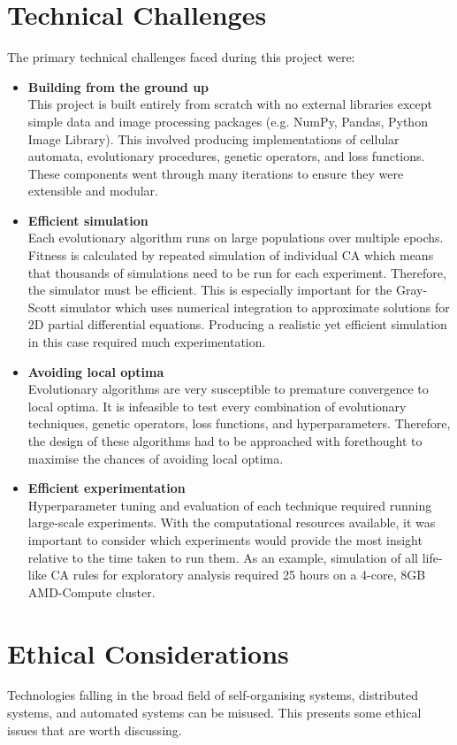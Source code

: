 \section{Technical Challenges}
The primary technical challenges faced during this project were:
\begin{itemize}
    \item \textbf{Building from the ground up}\\ This project is built entirely from scratch with no external libraries except simple data and image processing packages (e.g. NumPy, Pandas, Python Image Library). This involved producing implementations of cellular automata, evolutionary procedures, genetic operators, and loss functions. These components went through many iterations to ensure they were extensible and modular.
    \item \textbf{Efficient simulation}\\ Each evolutionary algorithm runs on large populations over multiple epochs. Fitness is calculated by repeated simulation of individual CA which means that thousands of simulations need to be run for each experiment. Therefore, the simulator must be efficient. This is especially important for the Gray-Scott simulator which uses numerical integration to approximate solutions for 2D partial differential equations. Producing a realistic yet efficient simulation in this case required much experimentation.
    \item \textbf{Avoiding local optima}\\ Evolutionary algorithms are very susceptible to premature convergence to local optima. It is infeasible to test every combination of evolutionary techniques, genetic operators, loss functions, and hyperparameters. Therefore, the design of these algorithms had to be approached with forethought to maximise the chances of avoiding local optima. 
    \item \textbf{Efficient experimentation}\\ Hyperparameter tuning and evaluation of each technique required running large-scale experiments. With the computational resources available, it was important to consider which experiments would provide the most insight relative to the time taken to run them. As an example, simulation of all life-like CA rules for exploratory analysis required 25 hours on a 4-core, 8GB AMD-Compute cluster.
\end{itemize}

\section{Ethical Considerations}
Technologies falling in the broad field of self-organising systems, distributed systems, and automated systems can be misused. This presents some ethical issues that are worth discussing.\\

